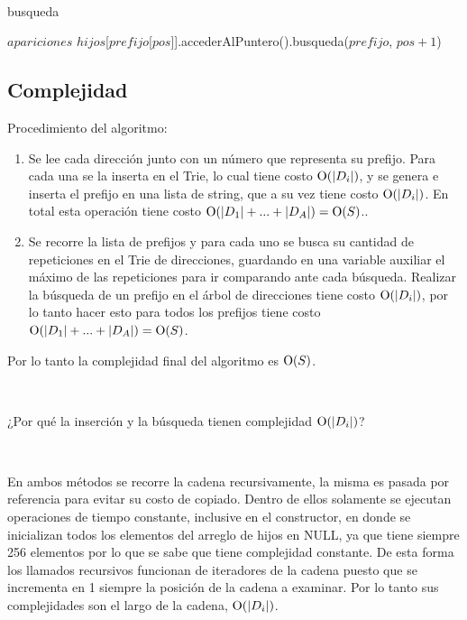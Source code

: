 ~

\begin{algorithm}[H]
	\caption{busqueda}

	 {
		\Return $apariciones$ \;
	} {
		 {
			 \;
		} {
			\Return $hijos$[$prefijo$[$pos$]].accederAlPuntero().busqueda($prefijo$, $pos + 1$) \;
		}
	}
\end{algorithm}

\subsection{Complejidad}

Procedimiento del algoritmo:

\begin{enumerate}
\item Se lee cada dirección junto con un número que representa su prefijo.
Para cada una se la inserta en el Trie, lo cual tiene costo $\operatorname{O}(|D_i|)$, y
se genera e inserta el prefijo en una lista de string, que a su vez tiene
costo $\operatorname{O}(|D_i|)$. En total esta operación tiene costo
$\operatorname{O}(|D_1| + ... + |D_A|) = \operatorname{O}(S)$..
\item Se recorre la lista de prefijos y para cada uno se busca su cantidad de
repeticiones en el Trie de direcciones, guardando en una variable auxiliar el
máximo de las repeticiones para ir comparando ante cada búsqueda. Realizar
la búsqueda de un prefijo en el árbol de direcciones tiene costo
$\operatorname{O}(|D_i|)$, por lo tanto hacer esto para todos los prefijos tiene costo
$\operatorname{O}(|D_1| + ... + |D_A|) = \operatorname{O}(S)$.
\end{enumerate}

Por lo tanto la complejidad final del algoritmo es $\operatorname{O}(S)$.

~

¿Por qué la inserción y la búsqueda tienen complejidad $\operatorname{O}(|D_i|)$?

~

En ambos métodos se recorre la cadena recursivamente, la misma es pasada por
referencia para evitar su costo de copiado. Dentro de ellos solamente se
ejecutan operaciones de tiempo constante, inclusive en el constructor, en
donde se inicializan todos los elementos del arreglo de hijos en NULL, ya que
tiene siempre 256 elementos por lo que se sabe que tiene complejidad
constante. De esta forma los llamados recursivos funcionan de iteradores de la
cadena puesto que se incrementa en 1 siempre la posición de la cadena a
examinar. Por lo tanto sus complejidades son el largo de la cadena,
$\operatorname{O}(|D_i|)$.

